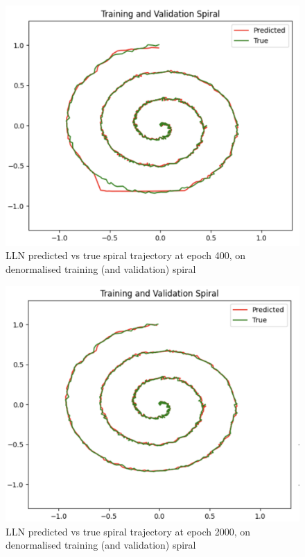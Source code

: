 \begin{figure}[H]
    \centering
    \includegraphics[width=0.8\linewidth]{img/lnn_training_validation_spiral_epoch_400.png}
    \caption{LLN predicted vs true spiral trajectory at epoch 400, on denormalised training (and validation) spiral}
    \label{fig:lnn_training_validation_spiral_epoch_400}
\end{figure}

\begin{figure}[H]
    \centering
    \includegraphics[width=0.8\linewidth]{img/lnn_training_validation_spiral_epoch_2000.png}
    \caption{LLN predicted vs true spiral trajectory at epoch 2000, on denormalised training (and validation) spiral}
    \label{fig:lnn_training_validation_spiral_epoch_2000}
\end{figure}

